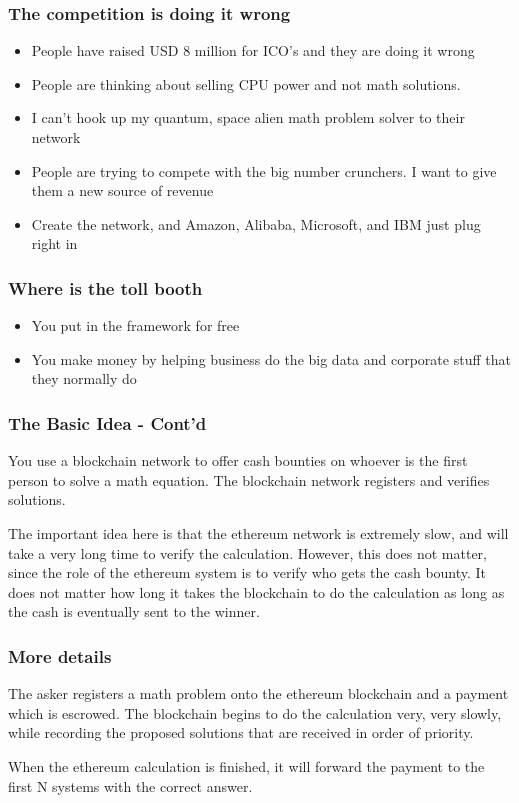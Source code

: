 \documentclass{beamer}
\begin{document}
\begin{frame}
  \frametitle{The competition is doing it wrong}
  \begin{itemize}
    \item People have raised USD 8 million for ICO's and they are
      doing it wrong
    \item People are thinking about selling CPU power and not
      math solutions.
    \item I can't hook up my quantum, space alien math problem solver
      to their network
    \item People are trying to compete with the big number crunchers.
      I want to give them a new source of revenue
    \item Create the network, and Amazon, Alibaba, Microsoft, and IBM
      just plug right in
  \end{itemize}
\end{frame}
\begin{frame}
  \frametitle{Where is the toll booth}
  \begin{itemize}
  \item You put in the framework for free
  \item You make money by helping business do the big data and
      corporate stuff that they normally do
  \end{itemize}
\end{frame}
\begin{frame}
  \frametitle{The Basic Idea - Cont'd}
You use a blockchain network to offer cash bounties on whoever is
the first person to solve a math equation.  The blockchain network
registers and verifies solutions.

The important idea here is that the ethereum network is extremely
slow, and will take a very long time to verify the calculation.  However,
this does not matter, since the role of the ethereum system is to
verify who gets the cash bounty.  It does not matter how long it takes
the blockchain to do the calculation as long as the cash is eventually
sent to the winner.
\end{frame}
\begin{frame}
  \frametitle{More details}
  The asker registers a math problem onto the ethereum blockchain and
  a payment which is escrowed.  The blockchain begins to do the
  calculation very, very slowly, while recording the proposed
  solutions that are received in order of priority.
  
  When the ethereum calculation is finished, it will forward the payment
  to the first N systems with the correct answer.
\end{frame}
\end{document}
